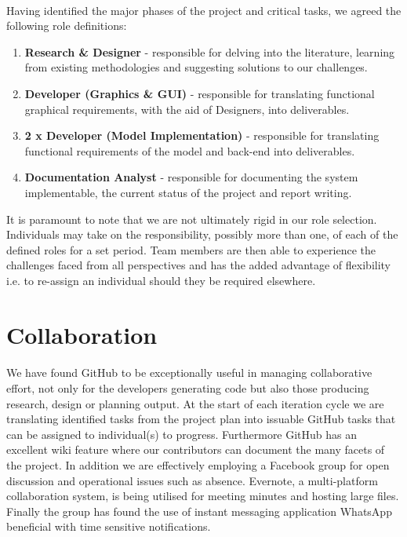 \documentclass[11pt,a4paper]{article}
\begin{document}
\paragraph{}
Having identified the major phases of the project and critical tasks, we agreed the following role definitions:

\begin{enumerate}
  \item \textbf{Research \& Designer} - responsible for delving into the literature, learning from existing methodologies and suggesting solutions to our challenges.
  \item \textbf{Developer (Graphics \& GUI)} - responsible for translating functional graphical requirements, with the aid of Designers, into deliverables.
  \item \textbf{2 x Developer (Model Implementation)} - responsible for translating functional requirements of the model and back-end into deliverables.
  \item \textbf{Documentation Analyst} - responsible for documenting the system implementable, the current status of the project and report writing.
\end{enumerate}

It is paramount to note that we are not ultimately rigid in our role selection.  Individuals may take on the responsibility, possibly more than one, of each of the defined roles for a set period.  Team members are then able to experience the challenges faced from all perspectives and has the added advantage of flexibility i.e. to re-assign an individual should they be required elsewhere.

\section{Collaboration}
\paragraph{}
We have found GitHub to be exceptionally useful in managing collaborative effort, not only for the developers generating code but also those producing research, design or planning output.  At the start of each iteration cycle we are translating identified tasks from the project plan into issuable GitHub tasks that can be assigned to individual(s) to progress.  Furthermore GitHub has an excellent wiki feature where our contributors can document the many facets of the project.
\newline
In addition we are effectively employing a Facebook group for open discussion and operational issues such as absence.  Evernote, a multi-platform collaboration system, is being utilised for meeting minutes and hosting large files.  Finally the group has found the use of instant messaging application WhatsApp beneficial with time sensitive notifications.
\end{document}
